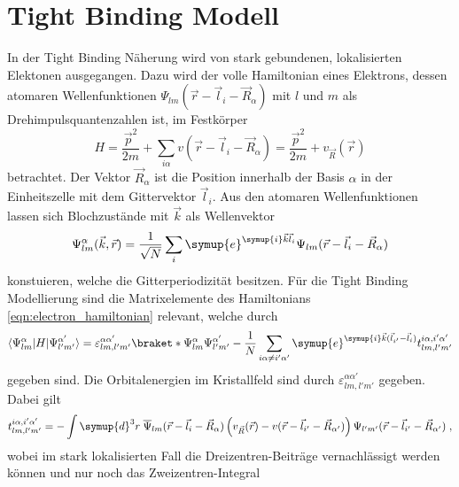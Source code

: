 \section{Tight Binding Modell}
\label{sec:tightbinding}
In der Tight Binding Näherung wird von stark gebundenen, lokalisierten Elektonen ausgegangen.\cite{Czycholl}
Dazu wird der volle Hamiltonian eines Elektrons, dessen atomaren Wellenfunktionen $\Psi_{lm}(\vec{r}-\vec{l}_i - \vec{R}_{\alpha})$ mit 
$l$ und $m$ als Drehimpulsquantenzahlen ist, im Festkörper
\begin{equation}
    H = \frac{\vec{p}^2}{2m} + \sum_{i\alpha} v(\vec{r}-\vec{l}_i - \vec{R}_{\alpha}) = \frac{\vec{p}^2}{2m} + v_{\vec{R}}(\vec{r})\label{eqn:electron_hamiltonian}
\end{equation}
betrachtet.\cite{Czycholl}
Der Vektor $\vec{R}_{\alpha}$ ist die Position innerhalb der Basis $\alpha$ in der Einheitszelle mit dem Gittervektor $\vec{l}_i$.
Aus den atomaren Wellenfunktionen lassen sich Blochzustände mit $\vec{k}$ als Wellenvektor
\begin{equation}
    \Psi^{\alpha}_{lm}(\vec{k}, \vec{r}) = \frac{1}{\sqrt{N}} \sum_{i} \symup{e}^{\symup{i}\vec{k}\vec{l}_i} \Psi_{lm}(\vec{r}-\vec{l}_i - \vec{R}_{\alpha}) 
\end{equation}
konstuieren, welche die Gitterperiodizität besitzen.\cite{SC_literature}
Für die Tight Binding Modellierung sind die Matrixelemente des Hamiltonians \eqref{eqn:electron_hamiltonian}
relevant, welche durch
\begin{equation*}
    \bra{\Psi^{\alpha}_{lm}} H \ket{\Psi^{\alpha'}_{l'm'}} = \varepsilon_{lm,l'm'}^{\alpha \alpha'} \braket*{\Psi^{\alpha}_{lm}}{\Psi^{\alpha'}_{l'm'}}
    - \frac{1}{N} \sum_{i\alpha \neq i' \alpha'} \symup{e}^{\symup{i}\vec{k}(\vec{l}_{i'}-\vec{l}_{i})}  t^{i\alpha,i'\alpha'}_{lm,l'm'}
\end{equation*}
gegeben sind.\cite{SC_literature}\cite{Czycholl}
Die Orbitalenergien im Kristallfeld sind durch $\varepsilon_{lm,l'm'}^{\alpha \alpha'}$ gegeben.\cite{SC_literature}
Dabei gilt
\begin{equation*}
    t^{i\alpha,i'\alpha'}_{lm,l'm'} = - \int \symup{d}^3r \; \overline{\Psi}_{lm}(\vec{r}-\vec{l}_i - \vec{R}_{\alpha}) 
    \left ( v_{\vec{R}} (\vec{r}) - v(\vec{r} - \vec{l}_{i'} - \vec{R}_{\alpha'} )   \right ) \Psi_{l'm'}(\vec{r}-\vec{l}_{i'} - \vec{R}_{\alpha'})  \; ,
\end{equation*}
wobei im stark lokalisierten Fall die Dreizentren-Beiträge vernachlässigt werden können und  
nur noch das Zweizentren-Integral 
